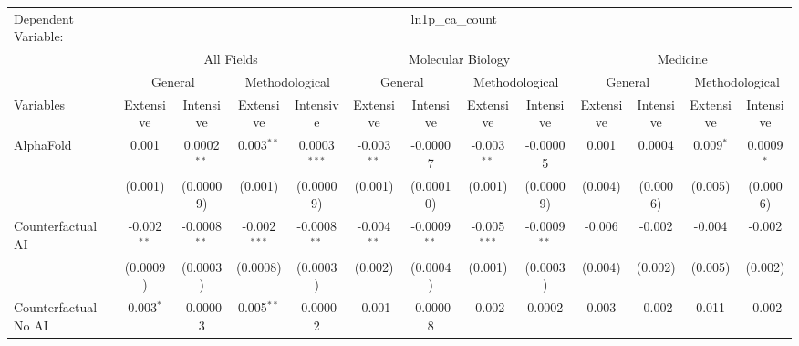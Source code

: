 \begingroup
\centering
\begin{tabular}{lcccccccccccc}
   \tabularnewline \midrule \midrule
   Dependent Variable: & \multicolumn{12}{c}{ln1p\_ca\_count}\\
 & \multicolumn{4}{c}{All Fields} & \multicolumn{4}{c}{Molecular Biology} & \multicolumn{4}{c}{Medicine} \\
\cmidrule(lr){2-5} \cmidrule(lr){6-9} \cmidrule(lr){10-13}
 & \multicolumn{2}{c}{General} & \multicolumn{2}{c}{Methodological} & \multicolumn{2}{c}{General} & \multicolumn{2}{c}{Methodological} & \multicolumn{2}{c}{General} & \multicolumn{2}{c}{Methodological} \\
\cmidrule(lr){2-3} \cmidrule(lr){4-5} \cmidrule(lr){6-7} \cmidrule(lr){8-9} \cmidrule(lr){10-11} \cmidrule(lr){12-13}
Variables & \multicolumn{1}{c}{Extensive} & \multicolumn{1}{c}{Intensive} & \multicolumn{1}{c}{Extensive} & \multicolumn{1}{c}{Intensive} & \multicolumn{1}{c}{Extensive} & \multicolumn{1}{c}{Intensive} & \multicolumn{1}{c}{Extensive} & \multicolumn{1}{c}{Intensive} & \multicolumn{1}{c}{Extensive} & \multicolumn{1}{c}{Intensive} & \multicolumn{1}{c}{Extensive} & \multicolumn{1}{c}{Intensive} \\
\cmidrule(lr){1-1}\cmidrule(lr){2-2} \cmidrule(lr){3-3} \cmidrule(lr){4-4} \cmidrule(lr){5-5} \cmidrule(lr){6-6} \cmidrule(lr){7-7} \cmidrule(lr){8-8} \cmidrule(lr){9-9} \cmidrule(lr){10-10} \cmidrule(lr){11-11} \cmidrule(lr){12-12} \cmidrule(lr){13-13}
   AlphaFold                                & 0.001         & 0.0002$^{**}$  & 0.003$^{**}$   & 0.0003$^{***}$ & -0.003$^{**}$ & -0.00007       & -0.003$^{**}$  & -0.00005       & 0.001   & 0.0004       & 0.009$^{*}$  & 0.0009$^{*}$\\   
                                            & (0.001)       & (0.00009)      & (0.001)        & (0.00009)      & (0.001)       & (0.00010)      & (0.001)        & (0.00009)      & (0.004) & (0.0006)     & (0.005)      & (0.0006)\\   
   Counterfactual AI                        & -0.002$^{**}$ & -0.0008$^{**}$ & -0.002$^{***}$ & -0.0008$^{**}$ & -0.004$^{**}$ & -0.0009$^{**}$ & -0.005$^{***}$ & -0.0009$^{**}$ & -0.006  & -0.002       & -0.004       & -0.002\\   
                                            & (0.0009)      & (0.0003)       & (0.0008)       & (0.0003)       & (0.002)       & (0.0004)       & (0.001)        & (0.0003)       & (0.004) & (0.002)      & (0.005)      & (0.002)\\   
   Counterfactual No AI                     & 0.003$^{*}$   & -0.00003       & 0.005$^{**}$   & -0.00002       & -0.001        & -0.00008       & -0.002         & 0.0002         & 0.003   & -0.002       & 0.011        & -0.002\\   

\end{tabular}
